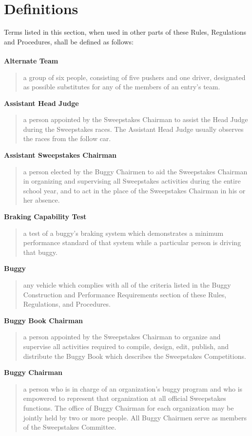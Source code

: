 \chapter{Definitions}

Terms listed in this section, when used in other parts of these Rules, Regulations and Procedures, shall be defined as follows:\\
\\
\textbf{Alternate Team}
\begin{quote}
	a group of six people, consisting of five pushers and one driver, designated as possible substitutes for any of the members of an entry's team.
\end{quote}

\textbf{Assistant Head Judge}
\begin{quote}
	a person appointed by the Sweepstakes Chairman to assist the Head Judge during the Sweepstakes races. The Assistant Head Judge usually observes the races from the follow car.
\end{quote}

\textbf{Assistant Sweepstakes Chairman}
\begin{quote}
	a person elected by the Buggy Chairmen to aid the Sweepstakes Chairman in organizing and supervising all Sweepstakes activities during the entire school year, and to act in the place of the Sweepstakes Chairman in his or her absence.
\end{quote}

\textbf{Braking Capability Test}
\begin{quote}
	a test of a buggy's braking system which demonstrates a minimum performance standard of that system while a particular person is driving that buggy.
\end{quote}

\textbf{Buggy}
\begin{quote}
	any vehicle which complies with all of the criteria listed in the Buggy Construction and Performance Requirements section of these Rules, Regulations, and Procedures.
\end{quote}

\textbf{Buggy Book Chairman}
\begin{quote}
	a person appointed by the Sweepstakes Chairman to organize and supervise all activities required to compile, design, edit, publish, and distribute the Buggy Book which describes the Sweepstakes Competitions.
\end{quote}

\textbf{Buggy Chairman}
\begin{quote}
	a person who is in charge of an organization's buggy program and who is empowered to represent that organization at all official Sweepstakes functions. The office of Buggy Chairman for each organization may be jointly held by two or more people. All Buggy Chairmen serve as members of the Sweepstakes Committee.
\end{quote}

